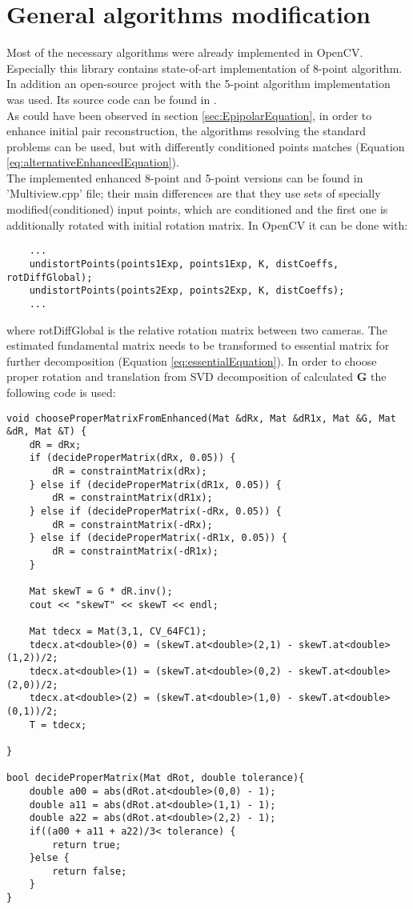 \section{General algorithms modification} %
Most of the necessary algorithms were already implemented in OpenCV. Especially this library contains state-of-art implementation of 8-point algorithm. In addition an open-source project with the 5-point algorithm implementation was used. Its source code can be found in \cite{website:relativePoseLibrary}. \\
As could have been observed in section \ref{sec:EpipolarEquation}, in order to enhance initial pair reconstruction, the algorithms resolving the standard problems can be used, but with differently conditioned points matches (Equation \ref{eq:alternativeEnhancedEquation}). \\
The implemented enhanced 8-point and 5-point versions can be found in 'Multiview.cpp' file; their main differences are that they use sets of specially modified(conditioned) input points, which are conditioned and the first one is additionally rotated with initial rotation matrix. In OpenCV it can be done with:
\begin{lstlisting}
    ...
    undistortPoints(points1Exp, points1Exp, K, distCoeffs, rotDiffGlobal);
    undistortPoints(points2Exp, points2Exp, K, distCoeffs);
    ...
\end{lstlisting}
where rotDiffGlobal is the relative rotation matrix between two cameras. The estimated fundamental matrix needs to be transformed to essential matrix for further decomposition (Equation \ref{eq:essentialEquation}). In order to choose proper rotation and translation from SVD decomposition of calculated \textbf{G} the following code is used:
\begin{lstlisting}
void chooseProperMatrixFromEnhanced(Mat &dRx, Mat &dR1x, Mat &G, Mat &dR, Mat &T) {
    dR = dRx;
    if (decideProperMatrix(dRx, 0.05)) {
        dR = constraintMatrix(dRx);
    } else if (decideProperMatrix(dR1x, 0.05)) {
        dR = constraintMatrix(dR1x);
    } else if (decideProperMatrix(-dRx, 0.05)) {
        dR = constraintMatrix(-dRx);
    } else if (decideProperMatrix(-dR1x, 0.05)) {
        dR = constraintMatrix(-dR1x);
    }

    Mat skewT = G * dR.inv();
    cout << "skewT" << skewT << endl;

    Mat tdecx = Mat(3,1, CV_64FC1);
    tdecx.at<double>(0) = (skewT.at<double>(2,1) - skewT.at<double>(1,2))/2;
    tdecx.at<double>(1) = (skewT.at<double>(0,2) - skewT.at<double>(2,0))/2;
    tdecx.at<double>(2) = (skewT.at<double>(1,0) - skewT.at<double>(0,1))/2;
    T = tdecx;

}

bool decideProperMatrix(Mat dRot, double tolerance){
    double a00 = abs(dRot.at<double>(0,0) - 1);
    double a11 = abs(dRot.at<double>(1,1) - 1);
    double a22 = abs(dRot.at<double>(2,2) - 1);
    if((a00 + a11 + a22)/3< tolerance) {
        return true;
    }else {
        return false;
    }
}
\end{lstlisting}

